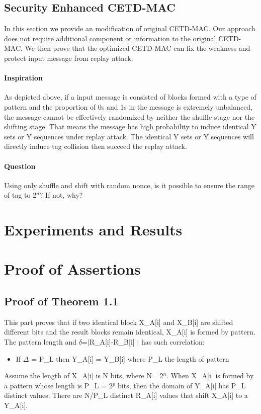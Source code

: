 \documentclass{article}
\begin{document}
\subsection{Security Enhanced CETD-MAC}
In this section we provide an modification of original CETD-MAC. Our approach does not require additional component or information to the original CETD-MAC. We then prove that the optimized CETD-MAC can fix the weakness and protect input message from replay attack.
\paragraph{Inspiration}
As depicted above, if a input message is consisted of blocks formed with a type of pattern and the proportion of 0s and 1s in the message is extremely unbalanced, the message cannot be effectively randomized by neither the shuffle stage nor the shifting stage. That means the message has high probability to induce identical Y sets or Y sequences under replay attack. The identical Y sets or Y sequences will directly induce tag collision then succeed the replay attack. 
\paragraph{Question}
Using only shuffle and shift with random nonce, is it possible to ensure the range of tag to 2$^n$? If not, why?

\section{Experiments and Results}

\appendix
\section{Proof of Assertions}
\subsection{Proof of Theorem 1.1}
This part proves that if two identical block X\_A[i]  and X\_B[i] are shifted different bits and the result blocks remain identical, X\_A[i] is formed by pattern. The pattern length and $\delta$=$\mid$R\_A[i]-R\_B[i] $\mid$ has such correlation:
\begin{itemize}
	\item If $\Delta$ = P\_L then Y\_A[i] = Y\_B[i] where P\_L the length of pattern
\end{itemize}
Assume the length of X\_A[i] is N bits, where N= 2$^n$. When X\_A[i] is formed by a pattern whose length is P\_L = 2$^p$ bits, then the domain of Y\_A[i] has P\_L distinct values. There are N/P\_L distinct R\_A[i] values that shift X\_A[i] to a Y\_A[i].  
\end{document}
